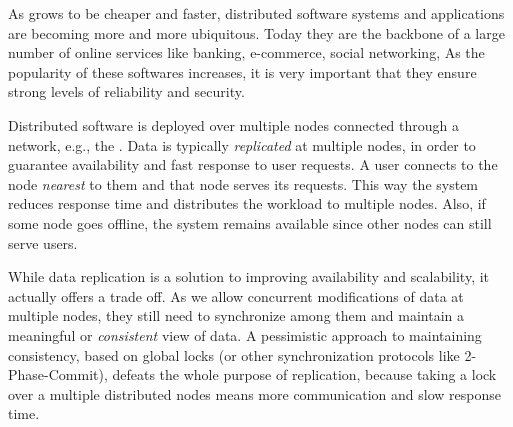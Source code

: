 


As \internet{} grows to be cheaper and faster, distributed software systems and applications are becoming more and more ubiquitous.
Today they are the backbone of a large number of online services like banking, e-commerce, social networking, \etc{}
As the popularity of these softwares increases, it is very important that they ensure strong levels of reliability and security.


Distributed software is deployed over multiple nodes connected through a network, e.g., the \internet{}. 
Data is typically \emph{replicated} at multiple nodes, in order to guarantee availability and fast response to user requests. 
A user connects to the node \emph{nearest} to them and that node serves its requests.
This way the system reduces response time and distributes the workload to multiple nodes. 
Also, if some node goes offline, the system remains available since other nodes can still serve users.

While data replication is a solution to improving availability and scalability, it actually offers a trade off.
As we allow concurrent modifications of data at multiple nodes, they still need to synchronize among them and maintain a meaningful or \emph{consistent} view of data.
A pessimistic approach to maintaining consistency, based on global locks (or other synchronization protocols like 2-Phase-Commit), defeats the whole purpose of replication, because taking a lock over a multiple distributed nodes means more communication and slow response time.

